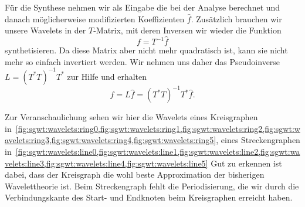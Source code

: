 F\"ur die Synthese nehmen wir als Eingabe die bei der Analyse 
berechnet und danach m\"oglicherweise modifizierten Koeffizienten $\hat{f}$. 
Zus\"atzlich brauchen wir unsere Wavelets in der $T$-Matrix, mit deren Inversen 
wir wieder die Funktion
\begin{equation*}
f = T^{-1} \hat{f}
\end{equation*}
synthetisieren. Da diese Matrix aber nicht mehr quadratisch ist, kann sie nicht 
mehr so einfach invertiert werden. Wir nehmen uns daher das Pseudoinverse $L = 
(T^*T)^{-1}T^*$ zur Hilfe und erhalten
\begin{equation}
f = L \hat{f} = (T^*T)^{-1}T^* \hat{f}.
\label{eq:sgwt:pseudof}
\end{equation}

Zur Veranschaulichung sehen wir hier die Wavelets eines Kreisgraphen 
in~\cref{fig:sgwt:wavelets:ring0,fig:sgwt:wavelets:ring1,fig:sgwt:wavelets:ring2,fig:sgwt:wavelets:ring3,fig:sgwt:wavelets:ring4,fig:sgwt:wavelets:ring5},
eines Streckengraphen 
in~\cref{fig:sgwt:wavelets:line0,fig:sgwt:wavelets:line1,fig:sgwt:wavelets:line2,fig:sgwt:wavelets:line3,fig:sgwt:wavelets:line4,fig:sgwt:wavelets:line5}
Gut zu erkennen ist dabei, dass der Kreisgraph die wohl beste Approximation der 
bisherigen Wavelettheorie ist. Beim Streckengraph fehlt die Periodisierung, die 
wir durch die Verbindungskante des Start- und Endknoten beim Kreisgraphen 
erreicht haben.
